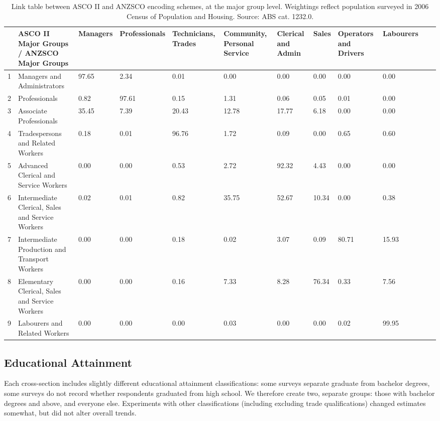 \begin{sidewaystable}[ht]
\centering
{\scriptsize
\begin{tabular}{|r|p{3cm}|p{1.5cm}|p{1.5cm}|p{1.5cm}|p{1.5cm}|p{1.5cm}|p{1.5cm}|p{1.5cm}|p{1.5cm}|p{1.5cm}|p{1.5cm}|}
  \hline
 & ASCO II Major Groups / ANZSCO Major Groups & Managers & Professionals & Technicians, Trades & Community, Personal Service & Clerical and Admin & Sales & Operators and Drivers & Labourers \\
  \hline
1 & Managers and Administrators & 97.65 & 2.34 & 0.01 & 0.00 & 0.00 & 0.00 & 0.00 & 0.00 \\
  2 & Professionals & 0.82 & 97.61 & 0.15 & 1.31 & 0.06 & 0.05 & 0.01 & 0.00 \\
  3 & Associate Professionals & 35.45 & 7.39 & 20.43 & 12.78 & 17.77 & 6.18 & 0.00 & 0.00 \\
  4 & Tradespersons and Related Workers & 0.18 & 0.01 & 96.76 & 1.72 & 0.09 & 0.00 & 0.65 & 0.60 \\
  5 & Advanced Clerical and Service Workers & 0.00 & 0.00 & 0.53 & 2.72 & 92.32 & 4.43 & 0.00 & 0.00 \\
  6 & Intermediate Clerical, Sales and Service Workers & 0.02 & 0.01 & 0.82 & 35.75 & 52.67 & 10.34 & 0.00 & 0.38 \\
  7 & Intermediate Production and Transport Workers & 0.00 & 0.00 & 0.18 & 0.02 & 3.07 & 0.09 & 80.71 & 15.93 \\
  8 & Elementary Clerical, Sales and Service Workers & 0.00 & 0.00 & 0.16 & 7.33 & 8.28 & 76.34 & 0.33 & 7.56 \\
  9 & Labourers and Related Workers & 0.00 & 0.00 & 0.00 & 0.03 & 0.00 & 0.00 & 0.02 & 99.95 \\
   \hline
\end{tabular}
}
\caption{Link table between ASCO II and ANZSCO encoding schemes, at the major group level. Weightings reflect population surveyed in 2006 Census of Population and Housing. Source: ABS cat. 1232.0.}
\label{tbl:link}
\end{sidewaystable}

\subsection{Educational Attainment}

Each cross-section includes slightly different educational attainment classifications: some surveys separate graduate from bachelor degrees, some surveys do not record whether respondents graduated from high school. We therefore create two, separate groups: those with bachelor degrees and above, and everyone else. Experiments with other classifications (including excluding trade qualifications) changed estimates somewhat, but did not alter overall trends.

